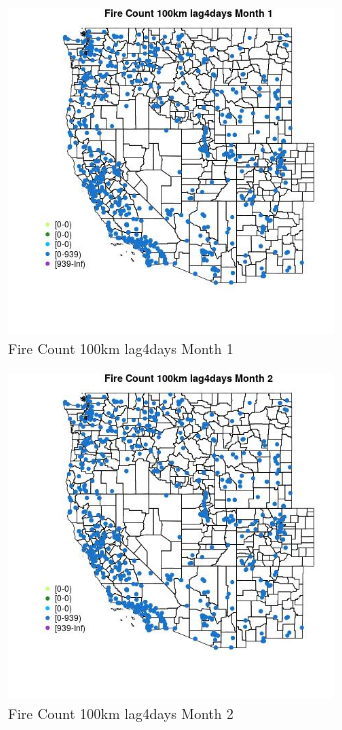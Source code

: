 \begin{figure} 
\centering  
\includegraphics[width=0.77\textwidth]{Code_Outputs/Report_ML_input_PM25_Step4_part_e_de_duplicated_aves_compiled_2019-05-21wNAs_MapObsMo1Fire_Count_100km_lag4days.jpg} 
\caption{\label{fig:Report_ML_input_PM25_Step4_part_e_de_duplicated_aves_compiled_2019-05-21wNAsMapObsMo1Fire_Count_100km_lag4days}Fire Count 100km lag4days Month 1} 
\end{figure} 
 

\clearpage 

\begin{figure} 
\centering  
\includegraphics[width=0.77\textwidth]{Code_Outputs/Report_ML_input_PM25_Step4_part_e_de_duplicated_aves_compiled_2019-05-21wNAs_MapObsMo2Fire_Count_100km_lag4days.jpg} 
\caption{\label{fig:Report_ML_input_PM25_Step4_part_e_de_duplicated_aves_compiled_2019-05-21wNAsMapObsMo2Fire_Count_100km_lag4days}Fire Count 100km lag4days Month 2} 
\end{figure} 
 

